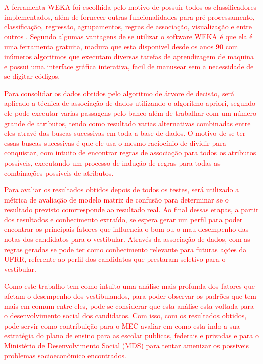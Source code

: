 \par
\textcolor{red}{A ferramenta WEKA foi escolhida pelo motivo de possuir todos os classificadores implementados, além de fornecer outras funcionalidades para pré-processamento, classificação, regressão, agrupamentos, regras de associação, visualização e entre outros \cite{Camilo2009}. Segundo  algumas vantagens de se utilizar o software WEKA é que ela é uma ferramenta gratuita, madura que esta disponivel desde os anos 90 com inúmeros algoritmos que executam diversas tarefas de aprendizagem de maquina e possui uma interface gráfica interativa, facil de manusear sem a necessidade de se digitar códigos.} 

\par
\textcolor{red}{Para consolidar os dados obtidos pelo algoritmo de árvore de decisão, será aplicado a técnica de associação de dados utilizando o algoritmo apriori, segundo  ele pode executar varias passagens pelo banco além de trabalhar com um número grande de atributos, tendo como resultado varias alternativas combinadas entre eles atravé das buscas sucessivas em toda a base de dados. O motivo de se ter essas buscas sucessivas é que ele usa o mesmo raciocínio de dividir para conquistar, com intuito de encontrar regras de associação para todos os atributos possíveis, executando um processo de indução de regras para todas as combinações possíveis de atributos.}

\par
\textcolor{red}{Para avaliar os resultados obtidos depois de todos os testes, será utilizado a métrica de avaliação de modelo matriz de confusão para determinar se o resultado previsto comrresponde ao resultado real. Ao final dessas etapas, a partir dos resultados e conhecimento extraído, se espera gerar um perfil para poder encontrar os principais fatores que influencia o bom ou o mau desempenho das notas dos candidatos para o vestibular. Através da associação de dados, com as regras geradas se pode ter como conhecimento relevante para futuras ações da UFRR, referente ao perfil dos candidatos que prestaram seletivo para o vestibular.}

\par 
\textcolor{red}{Como este trabalho tem como intuito uma análise mais profunda dos fatores que afetam o desempenho dos vestibulandos, para poder observar os padrões que tem mais em comum entre eles, pode-se considerar que esta análise esta voltada para o desenvolvimento social dos candidatos. Com isso, com os resultados obtidos, pode servir como contribuição para o MEC avaliar em como esta indo a sua estratégia do plano de ensino para as escolar publicas, federais e privadas e para o Ministério de Desenvolvimento Social (MDS) para tentar amenizar os possiveis problemas socioeconômico encontrados.}

